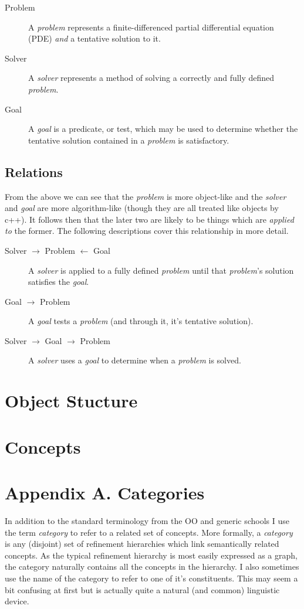 \documentclass{article}
\begin{document}
\begin{description}
\item[Problem]
A \emph{problem} represents a finite-differenced partial differential
	equation (PDE) \emph{and} a tentative solution to it.
\item[Solver]
A \emph{solver} represents a method of solving a correctly and fully
	defined \emph{problem}.
\item[Goal]
A \emph{goal} is a predicate, or test, which may be used to determine
	whether the tentative solution contained in a \emph{problem} is satisfactory.
\end{description}

\subsection{Relations}
From the above we can see that the \emph{problem} is more object-like and the \emph{solver} and
\emph{goal} are more algorithm-like (though they are all treated like objects by c++). It follows
then that the later two are likely to be things which are \emph{applied to} the former. The following
descriptions cover this relationship in more detail.
\begin{description}
\item[Solver $\rightarrow$ Problem $\leftarrow$ Goal]
A \emph{solver} is applied to a fully defined \emph{problem} until that \emph{problem}'s
  solution satisfies the \emph{goal}.
\item[Goal $\rightarrow$ Problem]
A \emph{goal} tests a \emph{problem} (and through it, it's tentative solution).
\item[Solver $\rightarrow$ Goal $\rightarrow$ Problem]
  A \emph{solver} uses a \emph{goal} to determine when a \emph{problem} is solved.
\end{description}

\section{Object Stucture}

\section{Concepts}

\section{Appendix A. Categories}
In addition to the standard terminology from the OO and generic schools I use the term
\emph{category} to refer to a related set of concepts. More formally, a \emph{category}
is any (disjoint) set of refinement hierarchies which link
semantically related concepts. As the typical refinement hierarchy is most easily expressed
as a graph, the category naturally contains all the concepts in the hierarchy.
I also sometimes use the name of the category to refer to one of it's constituents. This may seem a bit
confusing at first but is actually quite a natural (and common) linguistic device.
\end{document}
